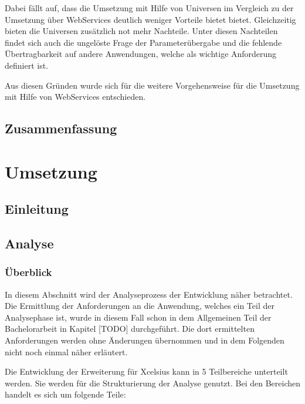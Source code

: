 Dabei fällt auf, dass die Umsetzung mit Hilfe von Universen im Vergleich zu der Umsetzung über WebServices deutlich weniger Vorteile bietet bietet. Gleichzeitig bieten die Universen zusätzlich not mehr Nachteile. Unter diesen Nachteilen findet sich auch die ungelöste Frage der Parameterübergabe und die fehlende Übertragbarkeit auf andere Anwendungen, welche als wichtige Anforderung definiert ist.

Aus diesen Gründen wurde sich für die weitere Vorgehensweise für die Umsetzung mit Hilfe von WebServices entschieden.



\section{Zusammenfassung}

\chapter{Umsetzung}
\section{Einleitung}
\section{Analyse}

\subsection{Überblick}

In diesem Abschnitt wird der Analyseprozess der Entwicklung näher betrachtet. Die Ermittlung der Anforderungen an die Anwendung, welches ein Teil der Analysephase ist, wurde in diesem Fall schon in dem Allgemeinen Teil der Bachelorarbeit in Kapitel [TODO] durchgeführt. Die dort ermittelten Anforderungen werden ohne Änderungen übernommen und in dem Folgenden nicht noch einmal näher erläutert.

Die Entwicklung der Erweiterung für Xcelsius kann in 5 Teilbereiche unterteilt werden. Sie werden für die Strukturierung der Analyse genutzt. Bei den Bereichen handelt es sich um folgende Teile:


